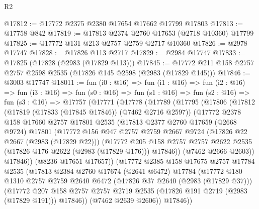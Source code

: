 \begin{lexlean}{R2}
\begin{coremodule}
@17812 := @17772 @2375 @2380 @17654 @17662 @17799 @17803
@17813 := @17758 @842
@17819 := @17813 @2374 @2760 @17653 (@2718 @10360) @17799
@17825 := @17772 @131 @213 @2757 @2759 @2717 @10360
@17826 := @2978 @17747
@17828 := @17826 @113 @2717
@17829 := @2984 @17747
@17833 := @17825 (@17828 (@2983 (@17829 @113)))
@17845 := @17772 @211 @158 @2757 @2757 @2598 @2535 (@17826 @145 @2598 (@2983 (@17829 @145)))
@17846 := @3003 @17747
@18011 := fun (i0 : @16) =>
  fun (i1 : @16) =>
  fun (i2 : @16) =>
  fun (i3 : @16) =>
  fun (s0 : @16) =>
  fun (s1 : @16) =>
  fun (s2 : @16) =>
  fun (s3 : @16) =>
  @17757
    (@17771
      (@17778
        (@17789
          (@17795
            (@17806
              (@17812
                (@17819 (@17833 (@17845 @17846)) (@7462 @2716 @2597))
                (@17772
                  @2378
                  @158
                  @17660
                  @2757
                  @17801
                  @2535
                  (@17813
                    @2377
                    @2760
                    @17659
                    (@2668 @9724)
                    @17801
                    (@17772
                      @156
                      @947
                      @2757
                      @2759
                      @2667
                      @9724
                      (@17826 @22 @2667 (@2983 (@17829 @22)))
                      (@17772
                        @205
                        @158
                        @2757
                        @2757
                        @2622
                        @2535
                        (@17826 @176 @2622 (@2983 (@17829 @176)))
                        @17846))
                    (@7462 @2666 @2603))
                  @17846))
              (@8236 @17651 @17657))
            (@17772
              @2385
              @158
              @17675
              @2757
              @17784
              @2535
              (@17813
                @2384
                @2760
                @17674
                (@2641 @6472)
                @17784
                (@17772
                  @180
                  @1310
                  @2757
                  @2759
                  @2640
                  @6472
                  (@17826 @37 @2640 (@2983 (@17829 @37)))
                  (@17772
                    @207
                    @158
                    @2757
                    @2757
                    @2719
                    @2535
                    (@17826 @191 @2719 (@2983 (@17829 @191)))
                    @17846))
                (@7462 @2639 @2606))
              @17846))

\end{coremodule}
\end{lexlean}
